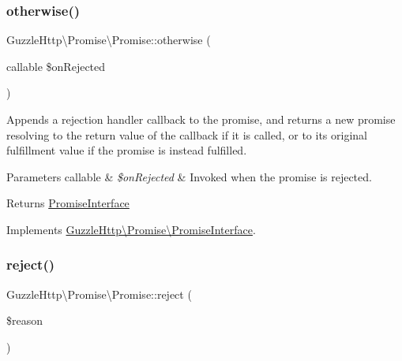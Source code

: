 \mbox{\label{classGuzzleHttp_1_1Promise_1_1Promise_a16b5c01afbddded8703161ec2f6694ad}} 
\subsubsection{\texorpdfstring{otherwise()}{otherwise()}}
{\footnotesize\ttfamily Guzzle\+Http\textbackslash{}\+Promise\textbackslash{}\+Promise\+::otherwise (\begin{DoxyParamCaption}\item[{callable}]{\$on\+Rejected }\end{DoxyParamCaption})}

Appends a rejection handler callback to the promise, and returns a new promise resolving to the return value of the callback if it is called, or to its original fulfillment value if the promise is instead fulfilled.


\begin{DoxyParams}[1]{Parameters}
callable & {\em \$on\+Rejected} & Invoked when the promise is rejected.\\
\hline
\end{DoxyParams}
\begin{DoxyReturn}{Returns}
\hyperlink{interfaceGuzzleHttp_1_1Promise_1_1PromiseInterface}{Promise\+Interface} 
\end{DoxyReturn}


Implements \hyperlink{interfaceGuzzleHttp_1_1Promise_1_1PromiseInterface_a4a7334842850943b3dd2fdd8ec23943b}{Guzzle\+Http\textbackslash{}\+Promise\textbackslash{}\+Promise\+Interface}.

\mbox{\label{classGuzzleHttp_1_1Promise_1_1Promise_af081d064b1d12bd61025907c94e7b4dd}} 
\subsubsection{\texorpdfstring{reject()}{reject()}}
{\footnotesize\ttfamily Guzzle\+Http\textbackslash{}\+Promise\textbackslash{}\+Promise\+::reject (\begin{DoxyParamCaption}\item[{}]{\$reason }\end{DoxyParamCaption})}

